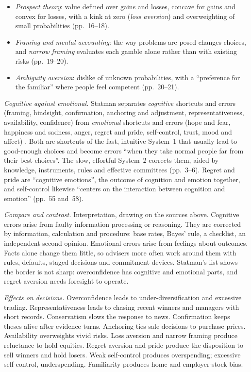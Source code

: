 \begin{qfdefinition}
\begin{itemize}
\item \emph{Prospect theory}: value defined over gains and losses, concave for gains and convex for losses, with a kink at zero (\emph{loss aversion}) and overweighting of small probabilities (pp.~16--18).
\item \emph{Framing and mental accounting}: the way problems are posed changes choices, and \emph{narrow framing} evaluates each gamble alone rather than with existing risks (pp.~19--20).
\item \emph{Ambiguity aversion}: dislike of unknown probabilities, with a ``preference for the familiar'' where people feel competent (pp.~20--21).
\end{itemize}

\emph{Cognitive against emotional.} Statman separates \emph{cognitive} shortcuts and errors (framing, hindsight, confirmation, anchoring and adjustment, representativeness, availability, confidence) from \emph{emotional} shortcuts and errors (hope and fear, happiness and sadness, anger, regret and pride, self-control, trust, mood and affect) \citep[chaps.~3--4, pp.~25--65]{behavioral-finance-second-generation-2019}. Both are shortcuts of the fast, intuitive System~1 that usually lead to good-enough choices and become errors ``when they take normal people far from their best choices''. The slow, effortful System~2 corrects them, aided by knowledge, instruments, rules and effective committees (pp.~3--6). Regret and pride are ``cognitive emotions'', the outcome of cognition and emotion together, and self-control likewise ``centers on the interaction between cognition and emotion'' (pp.~55 and~58).

 \emph{Compare and contrast.} Interpretation, drawing on the sources above. Cognitive errors arise from faulty information processing or reasoning. They are corrected by information, calculation and procedure: base rates, Bayes' rule, a checklist, an independent second opinion. Emotional errors arise from feelings about outcomes. Facts alone change them little, so advisers more often work around them with rules, defaults, staged decisions and commitment devices. Statman's list shows the border is not sharp: overconfidence has cognitive and emotional parts, and regret aversion needs foresight to operate.

\emph{Effects on decisions.} Overconfidence leads to under-diversification and excessive trading. Representativeness leads to chasing recent winners and managers with short records. Conservatism slows the response to news. Confirmation keeps theses alive after evidence turns. Anchoring ties sale decisions to purchase prices. Availability overweights vivid risks. Loss aversion and narrow framing produce reluctance to hold equities. Regret aversion and pride produce the disposition to sell winners and hold losers. Weak self-control produces overspending; excessive self-control, underspending. Familiarity produces home and employer-stock bias.


\end{qfdefinition}

